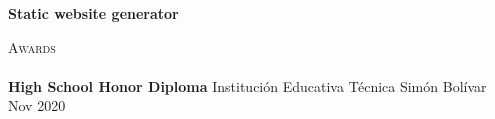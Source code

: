 \documentclass[a4paper]{article}
\newcommand{\lineunder} {
    \vspace*{-8pt} \\
    \hspace*{-18pt} \hrulefill \\
}
\newcommand{\header} [1] {
    {\hspace*{-18pt}\vspace*{6pt} \textsc{#1}}
    \vspace*{-6pt} \lineunder
}
\begin{document}
\vspace*{2mm}
{\textbf{Static website generator}}\\

\vspace*{2mm}

\header{Awards}
\textbf{High School Honor Diploma} \hfill Institución Educativa Técnica Simón Bolívar\\
\hfill Nov 2020\\
\vspace*{2mm}

\ 
\end{document}

